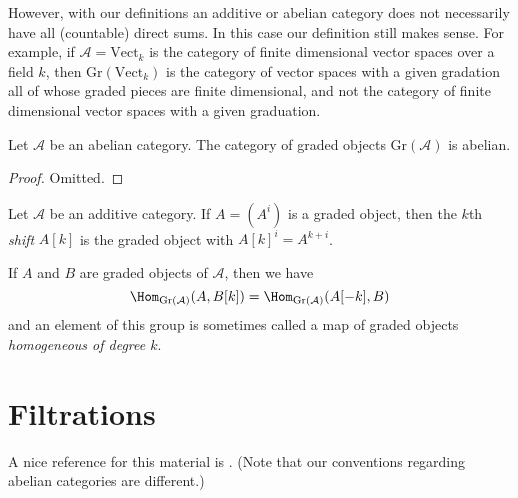 \medskip\noindent
However, with our definitions an additive or abelian category does not
necessarily have all (countable) direct sums. In this case our definition
still makes sense. For example, if $\mathcal{A} = \text{Vect}_k$ is the
category of finite dimensional vector spaces over a field $k$, then
$\text{Gr}(\text{Vect}_k)$ is the category of vector
spaces with a given gradation all of whose graded pieces are finite
dimensional, and not the category of finite dimensional vector
spaces with a given graduation.

\begin{lemma}
\label{lemma-graded}
Let $\mathcal{A}$ be an abelian category. The category of graded objects
$\text{Gr}(\mathcal{A})$ is abelian.
\end{lemma}

\begin{proof}
Omitted.
\end{proof}

\begin{definition}
\label{definition-graded-shift}
Let $\mathcal{A}$ be an additive category. If $A = (A^i)$ is a graded object,
then the $k$th {\it shift} $A[k]$ is the graded object with
$A[k]^i = A^{k + i}$.
\end{definition}

\noindent
If $A$ and $B$ are graded objects of $\mathcal{A}$, then we have
\begin{equation}
\label{equation-hom-into-shift}
\Hom_{\text{Gr}(\mathcal{A})}(A, B[k]) =
\Hom_{\text{Gr}(\mathcal{A})}(A[-k], B)
\end{equation}
and an element of this group is sometimes called a map of graded
objects {\it homogeneous of degree $k$}.






\section{Filtrations}
\label{section-filtrations}

\noindent
A nice reference for this material is \cite[Section 1]{HodgeII}.
(Note that our conventions regarding abelian categories are different.)

